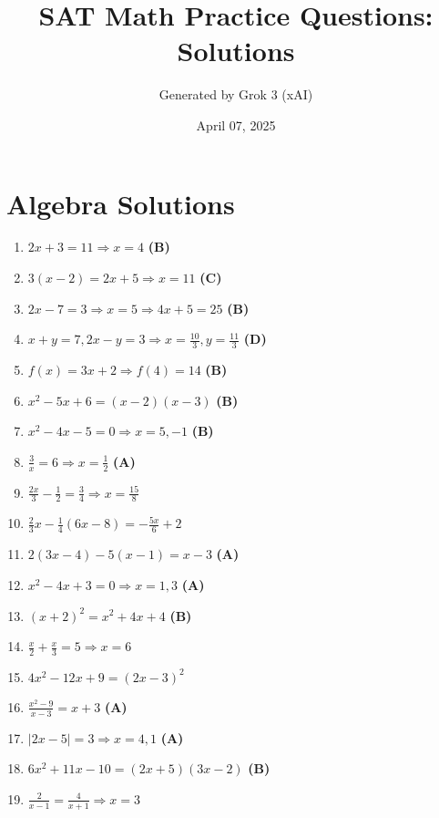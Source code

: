 \documentclass[12pt]{article}
\begin{document}
\title{SAT Math Practice Questions: Solutions}
\author{Generated by Grok 3 (xAI)}
\date{April 07, 2025}
\maketitle
\tableofcontents
\newpage

\section{Algebra Solutions}
\begin{enumerate}[label=\textbf{Question \arabic*:}]
  \item \( 2x + 3 = 11 \Rightarrow x = 4 \) \textbf{(B)}
  \item \( 3(x - 2) = 2x + 5 \Rightarrow x = 11 \) \textbf{(C)}
  \item \( 2x - 7 = 3 \Rightarrow x = 5 \Rightarrow 4x + 5 = 25 \) \textbf{(B)}
  \item \( x + y = 7, 2x - y = 3 \Rightarrow x = \frac{10}{3}, y = \frac{11}{3} \) \textbf{(D)}
  \item \( f(x) = 3x + 2 \Rightarrow f(4) = 14 \) \textbf{(B)}
  \item \( x^2 - 5x + 6 = (x - 2)(x - 3) \) \textbf{(B)}
  \item \( x^2 - 4x - 5 = 0 \Rightarrow x = 5, -1 \) \textbf{(B)}
  \item \( \frac{3}{x} = 6 \Rightarrow x = \frac{1}{2} \) \textbf{(A)}
  \item \( \frac{2x}{3} - \frac{1}{2} = \frac{3}{4} \Rightarrow x = \frac{15}{8} \)
  \item \( \frac{2}{3}x - \frac{1}{4}(6x - 8) = -\frac{5x}{6} + 2 \)
  \item \( 2(3x - 4) - 5(x - 1) = x - 3 \) \textbf{(A)}
  \item \( x^2 - 4x + 3 = 0 \Rightarrow x = 1, 3 \) \textbf{(A)}
  \item \( (x + 2)^2 = x^2 + 4x + 4 \) \textbf{(B)}
  \item \( \frac{x}{2} + \frac{x}{3} = 5 \Rightarrow x = 6 \)
  \item \( 4x^2 - 12x + 9 = (2x - 3)^2 \)
  \item \( \frac{x^2 - 9}{x - 3} = x + 3 \) \textbf{(A)}
  \item \( |2x - 5| = 3 \Rightarrow x = 4, 1 \) \textbf{(A)}
  \item \( 6x^2 + 11x - 10 = (2x + 5)(3x - 2) \) \textbf{(B)}
  \item \( \frac{2}{x - 1} = \frac{4}{x + 1} \Rightarrow x = 3 \)

\end{enumerate}
\end{document}
